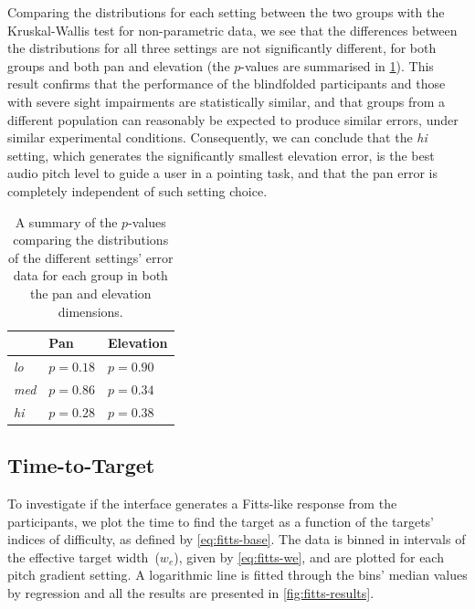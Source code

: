 \documentclass[acmsmall]{acmart}
\begin{document}
Comparing the distributions for each setting between the two groups with the Kruskal-Wallis test for non-parametric data, we see that the differences between the distributions for all three settings are not significantly different, for both groups and both pan and elevation (the $p$-values are summarised in \cref{tab:inter-group-results}).
This result confirms that the performance of the blindfolded participants and those with severe sight impairments are statistically similar, and that groups from a different population can reasonably be expected to produce similar errors, under similar experimental conditions. 
Consequently, we can conclude that the \textit{hi} setting, which generates the significantly smallest elevation error, is the best audio pitch level to guide a user in a pointing task, and that the pan error is completely independent of such setting choice. 

\begin{table}
  \centering
  \caption{A summary of the $p$-values comparing the distributions of the different settings' error data for each group in both the pan and elevation dimensions. }\label{tab:inter-group-results}
  \begin{tabular}{lll}
    \toprule
                   & Pan      & Elevation \\ \midrule
      \textit{lo}  & $p=0.18$ & $p=0.90$  \\
      \textit{med} & $p=0.86$ & $p=0.34$  \\
      \textit{hi}  & $p=0.28$ & $p=0.38$  \\
    \bottomrule
  \end{tabular}
\end{table}

\subsection{Time-to-Target}

To investigate if the interface generates a Fitts-like response from the participants, we plot the time to find the target as a function of the targets' indices of difficulty, as defined by \cref{eq:fitts-base}.
The data is binned in intervals of the effective target width~($w_e$), given by \cref{eq:fitts-we}, and are plotted for each pitch gradient setting. 
A logarithmic line is fitted through the bins' median values by regression and all the results are presented in \cref{fig:fitts-results}.
\end{document}
